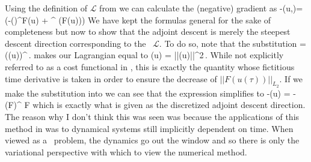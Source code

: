 Using the definition of $\mathcal{L}$ from 
we can calculate the (negative) gradient as
\beq \label{e-gradlambda}
-\nabla {}(u,\lambda)= (-(\nabla \lambda)^{\top}F(u) + \lambda^{\top} (\nabla F(u)))
\eeq
We have kept the formulas general for the sake of completeness but now to show
that the adjoint descent is merely the steepest descent direction
corresponding to the \spt\ $\mathcal{L}$.
To do so, note
that the substitution
\beq \label{e-lambdaF}
\lambda = ((u))^{\top}\,.
\eeq
makes our Lagrangian equal to
\beq
{}(u) = ||(u)||^2\,.
\eeq
While not explicitly referred to as a
cost functional in , this is
exactly the quantity whose fictitious time
derivative is taken in order to ensure the decrease of
$||F(u(\tau))||_{L_2}$.
If we make the substitution  into 
we can see that the expression simplifies to
\beq \label{e-gradLagrange}
-\nabla {}(u) = -(\nabla F)^{\top} F
\eeq
which is exactly what is given as the discretized adjoint
descent direction. The reason why I don't think this was
seen was because the applications of this method in
 was to dynamical systems still implicitly
dependent on time. When viewed as a \spt\ problem, the
dynamics go out the window and so there is only the variational
perspective with which to view the numerical method.
